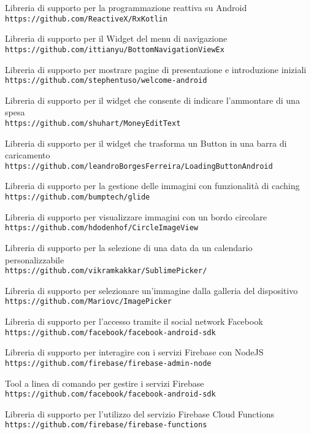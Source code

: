 \begin{thebibliography}{9}
Libreria di supporto per la programmazione reattiva su Android
\\\texttt{https://github.com/ReactiveX/RxKotlin}

Libreria di supporto per il Widget del menu di navigazione
\\\texttt{https://github.com/ittianyu/BottomNavigationViewEx}

Libreria di supporto per mostrare pagine di presentazione e introduzione iniziali
\\\texttt{https://github.com/stephentuso/welcome-android}

Libreria di supporto per il widget che consente di indicare l'ammontare di una spesa
\\\texttt{https://github.com/shuhart/MoneyEditText}

Libreria di supporto per il widget che trasforma un Button in una barra di caricamento
\\\texttt{https://github.com/leandroBorgesFerreira/LoadingButtonAndroid}

Libreria di supporto per la gestione delle immagini con funzionalità di caching
\\\texttt{https://github.com/bumptech/glide}

Libreria di supporto per visualizzare immagini con un bordo circolare
\\\texttt{https://github.com/hdodenhof/CircleImageView}

Libreria di supporto per la selezione di una data da un calendario personalizzabile
\\\texttt{https://github.com/vikramkakkar/SublimePicker/}

Libreria di supporto per selezionare un'immagine dalla galleria del dispositivo
\\\texttt{https://github.com/Mariovc/ImagePicker}

Libreria di supporto per l'accesso tramite il social network Facebook
\\\texttt{https://github.com/facebook/facebook-android-sdk}

Libreria di supporto per interagire con i servizi Firebase con NodeJS
\\\texttt{https://github.com/firebase/firebase-admin-node}

Tool a linea di comando per gestire i servizi Firebase
\\\texttt{https://github.com/facebook/facebook-android-sdk}

Libreria di supporto per l'utilizzo del servizio Firebase Cloud Functions
\\\texttt{https://github.com/firebase/firebase-functions}




\end{thebibliography}
